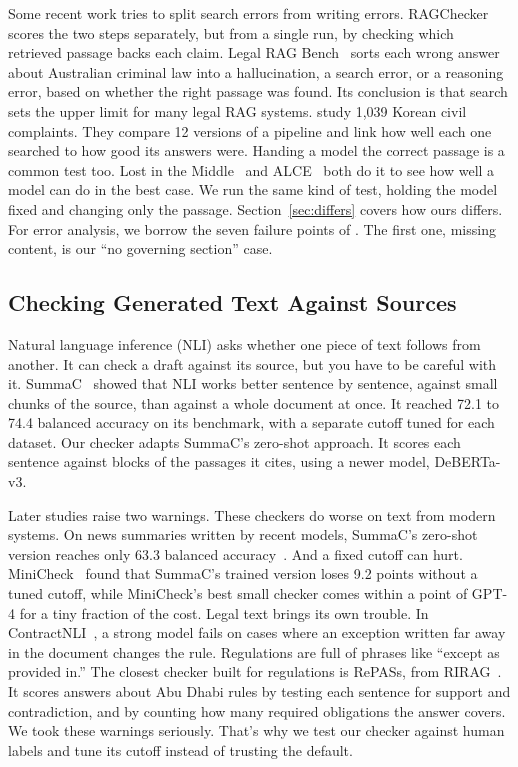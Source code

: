 \documentclass[10pt]{article}
\begin{document}
Some recent work tries to split search errors from writing errors.
RAGChecker~\cite{ru2024ragchecker} scores the two steps separately, but from a
single run, by checking which retrieved passage backs each claim. Legal RAG
Bench~\cite{butler2026legalragbench} sorts each wrong answer about Australian
criminal law into a hallucination, a search error, or a reasoning error, based
on whether the right passage was found. Its conclusion is that search sets the
upper limit for many legal RAG systems. \citet{kim2025legalai} study
1,039 Korean civil complaints. They compare 12 versions of a pipeline and link
how well each one searched to how good its answers were. Handing a model the
correct passage is a common test too. Lost in the Middle~\cite{liu2024lost} and
ALCE~\cite{gao2023alce} both do it to see how well a model can do in the best
case. We run the same kind of test, holding the model fixed and changing only
the passage. Section~\ref{sec:differs} covers how ours differs. For error
analysis, we borrow the seven failure points of \citet{barnett2024seven}.
The first one, missing content, is our ``no governing section'' case.

\subsection{Checking Generated Text Against Sources}
Natural language inference (NLI) asks whether one piece of text follows from
another. It can check a draft against its source, but you have to be careful
with it. SummaC~\cite{laban2022summac} showed that NLI works better sentence by
sentence, against small chunks of the source, than against a whole document at
once. It reached 72.1 to 74.4 balanced accuracy on its benchmark, with a
separate cutoff tuned for each dataset. Our checker adapts SummaC's zero-shot
approach. It scores each sentence against blocks of the passages it cites, using
a newer model, DeBERTa-v3.

Later studies raise two warnings. These checkers do worse on text from modern
systems. On news summaries written by recent models, SummaC's zero-shot version
reaches only 63.3 balanced accuracy~\cite{tang2023aggrefact}. And a fixed cutoff
can hurt. MiniCheck~\cite{tang2024minicheck} found that SummaC's trained version
loses 9.2 points without a tuned cutoff, while MiniCheck's best small checker
comes within a point of GPT-4 for a tiny fraction of the cost. Legal text brings
its own trouble. In ContractNLI~\cite{koreeda2021contractnli}, a strong model
fails on cases where an exception written far away in the document changes the
rule. Regulations are full of phrases like ``except as provided in.'' The closest
checker built for regulations is RePASs, from RIRAG~\cite{gokhan2024rirag}. It
scores answers about Abu Dhabi rules by testing each sentence for support and
contradiction, and by counting how many required obligations the answer covers.
We took these warnings seriously. That's why we test our checker against human
labels and tune its cutoff instead of trusting the default.
\end{document}
